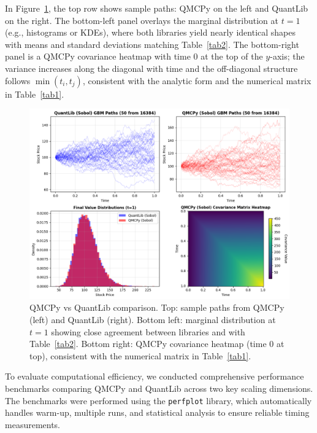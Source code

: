 

 In Figure~\ref{fig:qmcpy_quantlib_comparison}, the top row shows sample paths: QMCPy on the left and QuantLib on the right. The bottom-left panel overlays the marginal distribution at $t=1$ (e.g., histograms or KDEs), where both libraries yield nearly identical shapes with means and standard deviations matching Table~\ref{tab2}. The bottom-right panel is a QMCPy covariance heatmap with time 0 at the top of the $y$-axis; the variance increases along the diagonal with time and the off-diagonal structure follows $\min(t_i,t_j)$, consistent with the analytic form and the numerical matrix in Table~\ref{tab1}.

\begin{figure}[h]
\centering
\includegraphics[width=1\textwidth]{GBM/images/figure_5.png}
\caption{QMCPy vs QuantLib comparison. Top: sample paths from QMCPy (left) and QuantLib (right). Bottom left: marginal distribution at $t=1$ showing close agreement between libraries and with Table~\ref{tab2}. Bottom right: QMCPy covariance heatmap (time 0 at top), consistent with the numerical matrix in Table~\ref{tab1}.}
\label{fig:qmcpy_quantlib_comparison}
\end{figure}

To evaluate computational efficiency, we conducted comprehensive performance benchmarks comparing QMCPy and QuantLib across two key scaling dimensions. The benchmarks were performed using the \texttt{perfplot} library, which automatically handles warm-up, multiple runs, and statistical analysis to ensure reliable timing measurements. 

